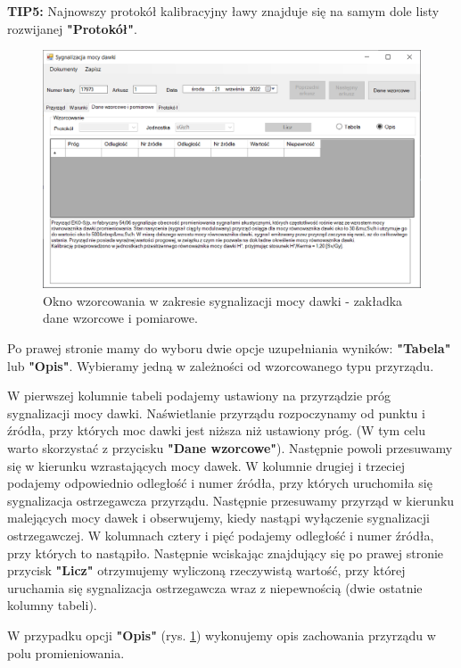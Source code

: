 {{	\textbf{TIP5:} Najnowszy protokół kalibracyjny ławy znajduje się na samym dole listy rozwijanej \textbf{"Protokół"}.
	
	\begin{figure}[htb]
	\centering
	\includegraphics[width=\columnwidth]{obrazki/Wzorcowanie/syg_mocy_dawki/dane2.png}
	\caption{Okno wzorcowania w zakresie sygnalizacji mocy dawki - zakładka dane wzorcowe i pomiarowe.}
	\label{sygMocyDane2}
\end{figure}

	Po prawej stronie mamy do wyboru dwie opcje uzupełniania wyników: \textbf{"Tabela"} lub \textbf{"Opis"}. Wybieramy jedną w zależności od wzorcowanego typu przyrządu. 
		
	W pierwszej kolumnie tabeli podajemy ustawiony na przyrządzie próg sygnalizacji mocy dawki. Naświetlanie przyrządu rozpoczynamy od punktu i źródła, przy których moc dawki jest niższa niż ustawiony próg. (W tym celu warto skorzystać z przycisku \textbf{"Dane wzorcowe"}). Następnie powoli przesuwamy się w kierunku wzrastających mocy dawek. W kolumnie drugiej i trzeciej podajemy odpowiednio odległość i numer źródła, przy których uruchomiła się sygnalizacja ostrzegawcza przyrządu. Następnie przesuwamy przyrząd w kierunku malejących mocy dawek i obserwujemy, kiedy nastąpi wyłączenie sygnalizacji ostrzegawczej. W kolumnach cztery i pięć podajemy odległość i numer źródła, przy których to nastąpiło. Następnie wciskając znajdujący się po prawej stronie przycisk \textbf{"Licz"} otrzymujemy wyliczoną rzeczywistą wartość, przy której uruchamia się sygnalizacja ostrzegawcza wraz z niepewnością (dwie ostatnie kolumny tabeli).

W przypadku opcji \textbf{"Opis"} (rys. \ref{sygMocyDane2}) wykonujemy opis zachowania przyrządu w polu promieniowania.
	
}}
